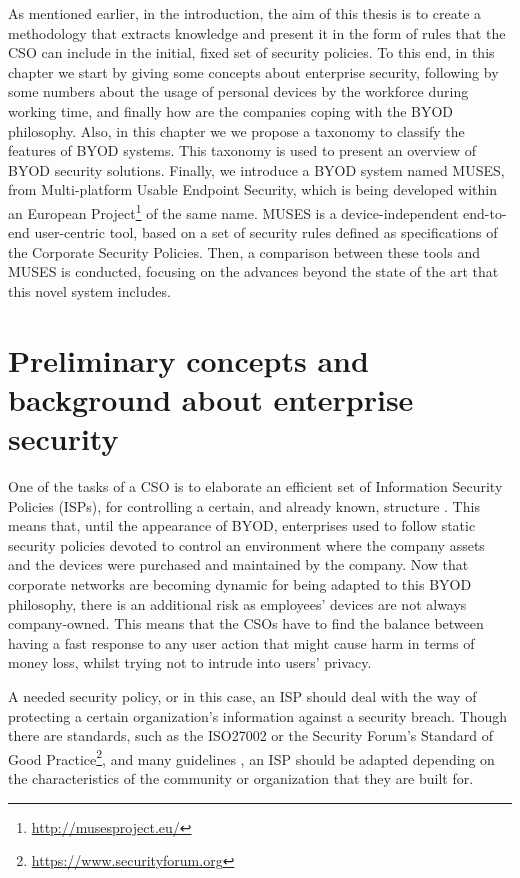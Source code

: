 As mentioned earlier, in the introduction, the aim of this thesis is to create a methodology that extracts knowledge and present it in the form of rules that the CSO can include in the initial, fixed set of security policies. To this end, in this chapter we start by giving some concepts about enterprise security, following by some numbers about the usage of personal devices by the workforce during working time, and finally how are the companies coping with the BYOD philosophy. Also, in this chapter we we propose a taxonomy to classify the features of BYOD systems. This taxonomy is used to present an overview of BYOD security solutions. Finally, we introduce a BYOD system named MUSES, from Multi-platform Usable Endpoint Security, which is being developed within an European Project\footnote{\url{http://musesproject.eu/}} of the same name. MUSES is a dev\-ice\--in\-de\-pen\-dent end-to-end user-centric tool, based on a set of security rules defined as specifications of the Corporate Security Policies. Then, a comparison between these tools and MUSES is conducted, focusing on the advances beyond the state of the art that this novel system includes.

\section{Preliminary concepts and background about enterprise security}
\label{sec:preliminaryconcepts}

One of the tasks of a CSO is to elaborate an efficient set of Information Security Policies (ISPs), for controlling a certain, and already known, structure \cite{Opp_Security11}. This means that, until the appearance of BYOD, enterprises used to follow static security policies devoted to control an environment where the company assets and the devices were purchased and maintained by the company. Now that corporate networks are becoming dynamic for being adapted to this BYOD philosophy, there is an additional risk as employees' devices are not always company-owned. This means that the CSOs have to find the balance between having a fast response to any user action that might cause harm in terms of money loss, whilst trying not to intrude into users' privacy.

A needed security policy, or in this case, an ISP should deal with the way of protecting a certain organization's information against a security breach. Though there are standards, such as the ISO27002 or the Security Forum's Standard of Good Practice\footnote{\url{https://www.securityforum.org}}, and many guidelines \cite{SecPol09}, an ISP should be adapted depending on the characteristics of the community or organization that they are built for.

